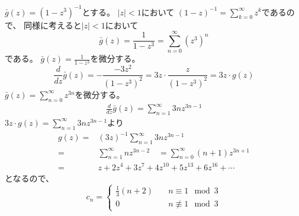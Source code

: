 \documentclass[12pt,b5paper]{ltjsarticle}
\begin{document}
\begin{enumerate}
       $\bar{g}(z)=(1-z^3)^{-1}$とする。
       $\rvert z \lvert <1$において
       $(1-z)^{-1}=\sum_{k=0}^{\infty}z^k$であるので、
       同様に考えると$\rvert z \lvert <1$において
       \begin{equation}
        \bar{g}(z)=\frac{1}{1-z^3} = \sum_{n=0}^{\infty}(z^3)^n
       \end{equation}
       である。
       $\bar{g}(z)=\frac{1}{1-z^3}$を微分する。
       \begin{equation}
        \frac{d}{dz}\bar{g}(z)=-\frac{-3z^2}{(1-z^3)^2}=3z\cdot\frac{z}{(1-z^3)^2} =3z\cdot g(z)
       \end{equation}
       $\bar{g}(z) = \sum_{n=0}^{\infty}z^{3n}$を微分する。
       \begin{align}
        \frac{d}{dz}\bar{g}(z) = \sum_{n=1}^{\infty}3nz^{3n-1}
       \end{align}
       $3z\cdot g(z)=\sum_{n=1}^{\infty}3nz^{3n-1}$より
       \begin{align}
        g(z) =& (3z)^{-1}\sum_{n=1}^{\infty}3nz^{3n-1}\\
        =& \sum_{n=1}^{\infty}nz^{3n-2}
        \quad
        = \sum_{n=0}^{\infty}(n+1)z^{3n+1}\\
        = & z + 2z^4+3z^7+4z^{10}+5z^{13}+6z^{16}+ \cdots
       \end{align}
       となるので、
        \begin{equation}
         c_n =
         \begin{cases}
          \frac{1}{3}(n+2) &\quad n\equiv 1 \mod 3\\
          0 &\quad n\not\equiv 1 \mod 3
         \end{cases}
        \end{equation}
\end{enumerate}
\end{document}
